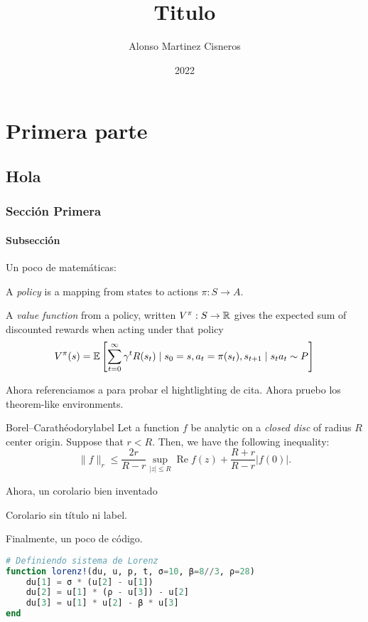 \documentclass[colorful]{sty/itam-thesis}
\author{Alonso Martinez Cisneros}
\title{Titulo}
\date{2022}
\begin{document}
\frontmatter
\maketitle
\makefrontmatter
{}

\mainmatter

\part{Primera parte}
\chapter{Hola}

\section{Sección Primera}
\lipsum[1-3]

\subsection{Subsección}
Un poco de matemáticas:

A \emph{policy} is a mapping from states to actions $\pi: S \to A$.

A \emph{value function} from a policy, written $V^{\pi}: S \to \mathbb{R}$ gives the expected sum 
of discounted rewards when acting under that policy
\begin{equation}
	V^{\pi} (s) = \mathbb{E} \left[ \sum_{t=0}^{\infty} \gamma^t R(s_t) \mid s_0 =s, a_t = 
	\pi(s_t), s_{t+1} \mid s_t a_t \sim P\right]
\end{equation}

Ahora referenciamos a \cite{ths:RodZ} para probar el hightlighting de cita. Ahora pruebo 
los theorem-like environments.

\begin{thrm}{Borel--Carathéodory}{label}
Let a function $f$ be analytic on a \emph{closed disc} of radius $R$ center origin.
Suppose that $r < R$. Then, we have the following inequality:
\begin{equation}
\|f\|_r \le \frac{2r}{R-r} \sup_{|z| \le R} \operatorname{Re} f(z) + \frac{R+r}{R-r} 
|f(0)|.
\end{equation}
\end{thrm}

Ahora, un corolario bien inventado

\begin{coro}{}{}
	Corolario sin título ni label.
\end{coro}

Finalmente, un poco de código.

\begin{lstlisting}[language=julia, caption=Aplicando algoritmo de cifrado]
# Definiendo sistema de Lorenz
function lorenz!(du, u, p, t, σ=10, β=8//3, ρ=28)
    du[1] = σ * (u[2] - u[1])
    du[2] = u[1] * (ρ - u[3]) - u[2]
    du[3] = u[1] * u[2] - β * u[3]
end
\end{lstlisting}


\nocite{*}
\printbibliography
\end{document}
